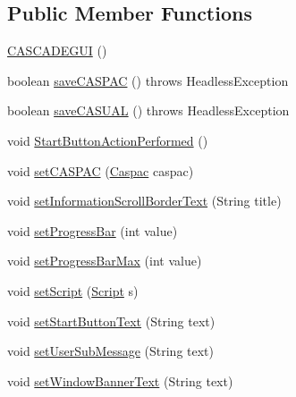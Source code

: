 \subsection*{Public Member Functions}
\begin{DoxyCompactItemize}
\item 
\hyperlink{class_c_a_s_c_a_d_e_g_u_i_1_1_c_a_s_c_a_d_e_g_u_i_a0b88ad9efe93a90a98d952994d90e48d}{C\-A\-S\-C\-A\-D\-E\-G\-U\-I} ()
\item 
boolean \hyperlink{class_c_a_s_c_a_d_e_g_u_i_1_1_c_a_s_c_a_d_e_g_u_i_a51bf4e148a88136f75b5d780993aebaf}{save\-C\-A\-S\-P\-A\-C} ()  throws Headless\-Exception 
\item 
boolean \hyperlink{class_c_a_s_c_a_d_e_g_u_i_1_1_c_a_s_c_a_d_e_g_u_i_ae85d06f07046a2594867d4dce9eae47b}{save\-C\-A\-S\-U\-A\-L} ()  throws Headless\-Exception 
\item 
void \hyperlink{class_c_a_s_c_a_d_e_g_u_i_1_1_c_a_s_c_a_d_e_g_u_i_a0b56a081d828cd896d81278086a55871}{Start\-Button\-Action\-Performed} ()
\item 
void \hyperlink{class_c_a_s_c_a_d_e_g_u_i_1_1_c_a_s_c_a_d_e_g_u_i_aac14a58f86200f7e55e2223db8a7b5d8}{set\-C\-A\-S\-P\-A\-C} (\hyperlink{class_c_a_s_u_a_l_1_1caspac_1_1_caspac}{Caspac} caspac)
\item 
void \hyperlink{class_c_a_s_c_a_d_e_g_u_i_1_1_c_a_s_c_a_d_e_g_u_i_a105553c3bb3dbadac14672993160cb1e}{set\-Information\-Scroll\-Border\-Text} (String title)
\item 
void \hyperlink{class_c_a_s_c_a_d_e_g_u_i_1_1_c_a_s_c_a_d_e_g_u_i_adb2973646bf59367a782ad933bc86c60}{set\-Progress\-Bar} (int value)
\item 
void \hyperlink{class_c_a_s_c_a_d_e_g_u_i_1_1_c_a_s_c_a_d_e_g_u_i_a2c09183b7f524fda208305ad72ac05ef}{set\-Progress\-Bar\-Max} (int value)
\item 
void \hyperlink{class_c_a_s_c_a_d_e_g_u_i_1_1_c_a_s_c_a_d_e_g_u_i_a6b753ecf736bbae2c6781c927f997eb4}{set\-Script} (\hyperlink{class_c_a_s_u_a_l_1_1caspac_1_1_script}{Script} s)
\item 
void \hyperlink{class_c_a_s_c_a_d_e_g_u_i_1_1_c_a_s_c_a_d_e_g_u_i_a4ac6e6fe72d4de88c0ea75c92b9ef6e7}{set\-Start\-Button\-Text} (String text)
\item 
void \hyperlink{class_c_a_s_c_a_d_e_g_u_i_1_1_c_a_s_c_a_d_e_g_u_i_a9ba4a4e48c40ab24017af25d07d8537b}{set\-User\-Sub\-Message} (String text)
\item 
void \hyperlink{class_c_a_s_c_a_d_e_g_u_i_1_1_c_a_s_c_a_d_e_g_u_i_a80c9fe66dd68d134dc13759c2a757d74}{set\-Window\-Banner\-Text} (String text)

\end{DoxyCompactItemize}
